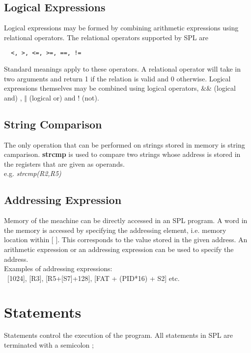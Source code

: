 \documentclass[11pt]{article}
\begin{document}
\subsection{Logical Expressions}

Logical expressions may be formed by combining arithmetic expressions using relational operators. The relational operators supported by SPL are \begin{verbatim}  <, >, <=, >=, ==, !=
\end{verbatim}
Standard  meanings apply to these operators. A relational operator will take in two arguments and return 1 if the relation is valid and 0 otherwise. Logical expressions themselves may be combined using logical operators, \&\& (logical and) ,  $\Vert$ (logical or) and ! (not).

\subsection{String Comparison}
The only operation that can be performed on strings stored in memory is string camparison. \textbf{strcmp} is used to compare two strings whose address is stored in the registers that are given as operands. \\

 e.g. \textit{strcmp(R2,R5)}


\subsection{Addressing Expression}
Memory of the meachine can be directly accessed in an SPL program. A word in the memory is accessed by specifying the addressing element, i.e. memory location within [ ]. This  corresponds to the value stored in the given address. An arithmetic expression or an addressing expression can be used to specify the address. \\

Examples of addressing expressions: \\\   
 [1024], [R3], [R5+[S7]+128], [FAT + (PID*16) + S2] etc.

\section{Statements}

Statements control the execution of the program. All statements in SPL are terminated with a semicolon ;
\end{document}
